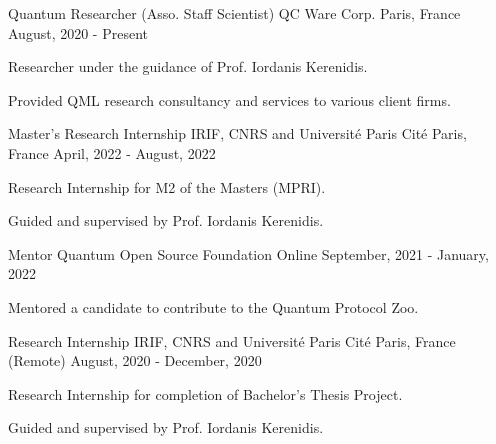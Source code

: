 

\begin{cventries}

  \cventry
    {Quantum Researcher (Asso. Staff Scientist)} %
    {QC Ware Corp.} %
    {Paris, France} %
    {August, 2020 - Present} %
    {
      \begin{cvitems} %
        \item {Researcher under the guidance of Prof. Iordanis Kerenidis.}
        \item {Provided QML research consultancy and services to various client firms.}
      \end{cvitems}
    }

  \cventry
    {Master's Research Internship} %
    {IRIF, CNRS and  Université Paris Cité} %
    {Paris, France} %
    {April, 2022 - August, 2022} %
    {
      \begin{cvitems} %
        \item {Research Internship for M2 of the Masters (MPRI).}
        \item {Guided and supervised by Prof. Iordanis Kerenidis.}
      \end{cvitems}
    }

  \cventry
    {Mentor} %
    {Quantum Open Source Foundation} %
    {Online} %
    {September, 2021 - January, 2022} %
    {
      \begin{cvitems} %
        \item {Mentored a candidate to contribute to the Quantum Protocol Zoo.}
      \end{cvitems}
    }

  \cventry
    {Research Internship} %
    {IRIF, CNRS and  Université Paris Cité} %
    {Paris, France (Remote)} %
    {August, 2020 - December, 2020} %
    {
      \begin{cvitems} %
        \item {Research Internship for completion of Bachelor's Thesis Project.}
        \item {Guided and supervised by Prof. Iordanis Kerenidis.}
      \end{cvitems}
    }


\end{cventries}
